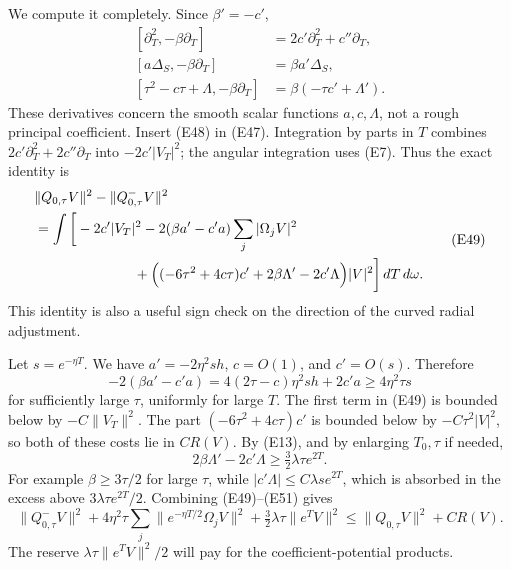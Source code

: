 \documentclass[
  11pt,
]{article}
\begin{document}
We compute it completely. Since \(\beta'=-c'\), \[
\begin{split}
 [\partial_T^2,-\beta\partial_T]&=2c'\partial_T^2+c''\partial_T,\\
 [a\Delta_S,-\beta\partial_T]&=\beta a'\Delta_S,\\
 [\tau^2-c\tau+\Lambda,-\beta\partial_T]
                                     &=\beta(-\tau c'+\Lambda').
\end{split}                                                       \tag{E48}
\] These derivatives concern the smooth scalar functions
\(a,c,\Lambda\), not a rough principal coefficient. Insert (E48) in
(E47). Integration by parts in \(T\) combines
\(2c'\partial_T^2+2c''\partial_T\) into \(-2c'|V_T|^2\); the angular
integration uses (E7). Thus the exact identity is \[
\begin{split}
 &\|Q_{0,\tau}V\|^2-\|Q_{0,\tau}^-V\|^2\\
 &=\int\bigg[
       -2c'|V_T|^2
       -2(\beta a'-c'a)\sum_j|\Omega_jV|^2\\
 &\hspace{25mm}
       +\Big((-6\tau^2+4c\tau)c'
                      +2\beta\Lambda'-2c'\Lambda\Big)|V|^2
                                            \bigg]\,dT\,d\omega.
\end{split}                                                       \tag{E49}
\] This identity is also a useful sign check on the direction of the
curved radial adjustment.

Let \(s=e^{-\eta T}\). We have \(a'=-2\eta^2s h\), \(c=O(1)\), and
\(c'=O(s)\). Therefore \[
 -2(\beta a'-c'a)=4(2\tau-c)\eta^2s h+2c'a
                    \geq4\eta^2\tau s                         \tag{E50}
\] for sufficiently large \(\tau\), uniformly for large \(T\). The first
term in (E49) is bounded below by \(-C\|V_T\|^2\). The part
\((-6\tau^2+4c\tau)c'\) is bounded below by \(-C\tau^2|V|^2\), so both
of these costs lie in \(CR(V)\). By (E13), and by enlarging \(T_0,\tau\)
if needed, \[
                    2\beta\Lambda'-2c'\Lambda
                        \geq\tfrac32\lambda\tau e^{2T}.        \tag{E51}
\] For example \(\beta\geq3\tau/2\) for large \(\tau\), while
\(|c'\Lambda|\leq C\lambda s e^{2T}\), which is absorbed in the excess
above \(3\lambda\tau e^{2T}/2\). Combining (E49)--(E51) gives \[
 \|Q_{0,\tau}^-V\|^2
   +4\eta^2\tau\sum_j\|e^{-\eta T/2}\Omega_jV\|^2
   +\tfrac32\lambda\tau\|e^TV\|^2
                  \leq\|Q_{0,\tau}V\|^2+CR(V).                \tag{E52}
\] The reserve \(\lambda\tau\|e^TV\|^2/2\) will pay for the
coefficient-potential products.
\end{document}
